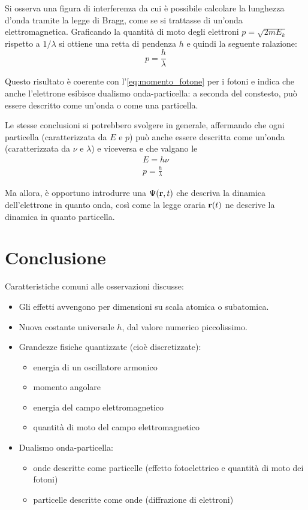 Si osserva una figura di interferenza da cui è possibile calcolare la lunghezza d'onda tramite la legge di Bragg, come se si trattasse di un'onda elettromagnetica.
Graficando la quantità di moto degli elettroni $p = \sqrt{2 m E_k}$ rispetto a $1 / \lambda$ si ottiene una retta di pendenza $h$ e quindi la seguente ralazione:
\begin{equation}
    p = \frac{h}{\lambda}
\end{equation}

Questo risultato è coerente con l'\cref{eq:momento_fotone} per i fotoni e indica che anche l'elettrone esibisce dualismo onda-particella: a seconda del constesto, può essere descritto come un'onda o come una particella.

Le stesse conclusioni si potrebbero svolgere in generale, affermando che ogni particella (caratterizzata da $E$ e $p$) può anche essere descritta come un'onda (caratterizzata da $\nu$ e $\lambda$) e viceversa e che valgano le 
\begin{subequations}
\begin{gather}
    E = h \nu \\
    p = \frac{h}{\lambda}
\end{gather}
\end{subequations}

Ma allora, è opportuno introdurre una  $\Psi(\mathbf{r}, t)$ che descriva la dinamica dell'elettrone in quanto onda, così come la legge oraria $\mathbf{r}(t)$ ne descrive la dinamica in quanto particella.


\section{Conclusione}

Caratteristiche comuni alle osservazioni discusse:
\begin{itemize}
    \item Gli effetti avvengono per dimensioni su scala atomica o subatomica.
    \item Nuova costante universale $h$, dal valore numerico piccolissimo.
    \item Grandezze fisiche quantizzate (cioè discretizzate):
    \begin{itemize}
        \item energia di un oscillatore armonico
        \item momento angolare
        \item energia del campo elettromagnetico
        \item quantità di moto del campo elettromagnetico
    \end{itemize}
    \item Dualismo onda-particella:
    \begin{itemize}
        \item onde descritte come particelle (effetto fotoelettrico e quantità di moto dei fotoni)
        \item particelle descritte come onde (diffrazione di elettroni)
    \end{itemize}
\end{itemize}

